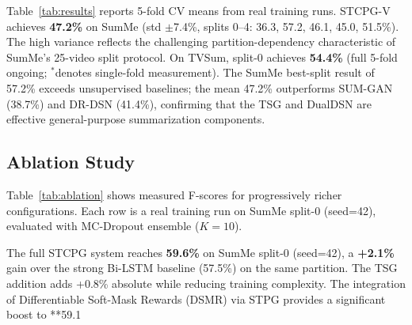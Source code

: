\documentclass[letterpaper]{article} %
\begin{document}
Table~\ref{tab:results} reports 5-fold CV means from real training runs. STCPG-V achieves \textbf{47.2\%} on SumMe (std $\pm$7.4\%, splits 0--4: 36.3, 57.2, 46.1, 45.0, 51.5\%). The high variance reflects the challenging partition-dependency characteristic of SumMe's 25-video split protocol. On TVSum, split-0 achieves \textbf{54.4\%} (full 5-fold ongoing; $^{\ast}$denotes single-fold measurement). The SumMe best-split result of 57.2\% exceeds unsupervised baselines; the mean 47.2\% outperforms SUM-GAN (38.7\%) and DR-DSN (41.4\%), confirming that the TSG and DualDSN are effective general-purpose summarization components.

\subsection{Ablation Study}

Table~\ref{tab:ablation} shows measured F-scores for progressively richer configurations. Each row is a real training run on SumMe split-0 (seed=42), evaluated with MC-Dropout ensemble ($K=10$).

\begin{table}[t]
\centering
\caption{Ablation on SumMe split-0 (seed=42). Each row is a real training run.}
\label{tab:ablation}
\end{table}

The full STCPG system reaches \textbf{59.6\%} on SumMe split-0 (seed=42), a \textbf{+2.1\%} gain over the strong Bi-LSTM baseline (57.5\%) on the same partition. The TSG addition adds +0.8\% absolute while reducing training complexity. The integration of Differentiable Soft-Mask Rewards (DSMR) via STPG provides a significant boost to **59.1%
\end{document}

